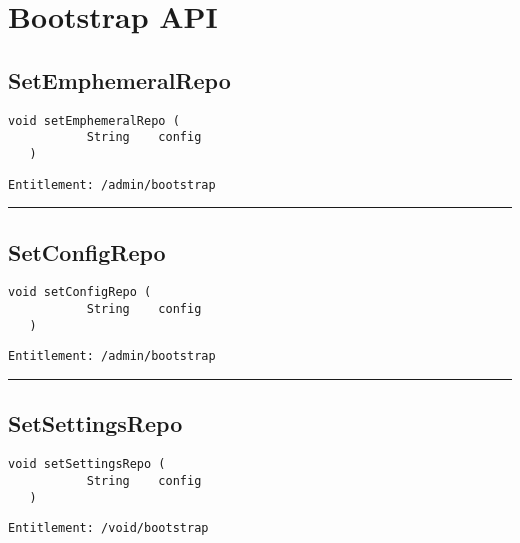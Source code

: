 \chapter{Bootstrap API}

\section{SetEmphemeralRepo}
\label{Api:SetEmphemeralRepo}
\begin{lstlisting}[style=nonumbers]
   void setEmphemeralRepo (
           String    config
   )
\end{lstlisting}
\begin{Verbatim}[formatcom=\color{Maroon}]
  Entitlement: /admin/bootstrap
\end{Verbatim}



\rule{12cm}{2pt}
\section{SetConfigRepo}
\label{Api:SetConfigRepo}
\begin{lstlisting}[style=nonumbers]
   void setConfigRepo (
           String    config
   )
\end{lstlisting}
\begin{Verbatim}[formatcom=\color{Maroon}]
  Entitlement: /admin/bootstrap
\end{Verbatim}



\rule{12cm}{2pt}
\section{SetSettingsRepo}
\label{Api:SetSettingsRepo}
\begin{lstlisting}[style=nonumbers]
   void setSettingsRepo (
           String    config
   )
\end{lstlisting}
\begin{Verbatim}[formatcom=\color{Maroon}]
  Entitlement: /void/bootstrap
\end{Verbatim}



